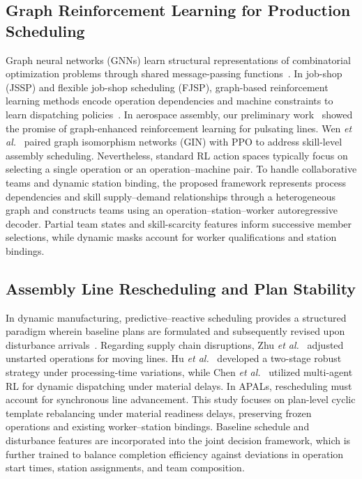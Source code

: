 \documentclass[journal,10pt]{IEEEtran}
\begin{document}
\subsection{Graph Reinforcement Learning for Production Scheduling}

Graph neural networks (GNNs) learn structural representations of combinatorial optimization problems through shared message-passing functions~\cite{cappart2023}. In job-shop (JSSP) and flexible job-shop scheduling (FJSP), graph-based reinforcement learning methods encode operation dependencies and machine constraints to learn dispatching policies~\cite{zhang2020,park2021,wang2024flexible}. In aerospace assembly, our preliminary work~\cite{ai2025} showed the promise of graph-enhanced reinforcement learning for pulsating lines. Wen \textit{et al.}~\cite{wen2026b} paired graph isomorphism networks (GIN) with PPO to address skill-level assembly scheduling. Nevertheless, standard RL action spaces typically focus on selecting a single operation or an operation--machine pair. To handle collaborative teams and dynamic station binding, the proposed framework represents process dependencies and skill supply--demand relationships through a heterogeneous graph and constructs teams using an operation--station--worker autoregressive decoder. Partial team states and skill-scarcity features inform successive member selections, while dynamic masks account for worker qualifications and station bindings.

\subsection{Assembly Line Rescheduling and Plan Stability}

In dynamic manufacturing, predictive--reactive scheduling provides a structured paradigm wherein baseline plans are formulated and subsequently revised upon disturbance arrivals~\cite{vieira2003,vonder2007}. Regarding supply chain disruptions, Zhu \textit{et al.}~\cite{zhu2021} adjusted unstarted operations for moving lines. Hu \textit{et al.}~\cite{hu2024} developed a two-stage robust strategy under processing-time variations, while Chen \textit{et al.}~\cite{chen2026} utilized multi-agent RL for dynamic dispatching under material delays. In APALs, rescheduling must account for synchronous line advancement. This study focuses on plan-level cyclic template rebalancing under material readiness delays, preserving frozen operations and existing worker--station bindings. Baseline schedule and disturbance features are incorporated into the joint decision framework, which is further trained to balance completion efficiency against deviations in operation start times, station assignments, and team composition.
\end{document}

